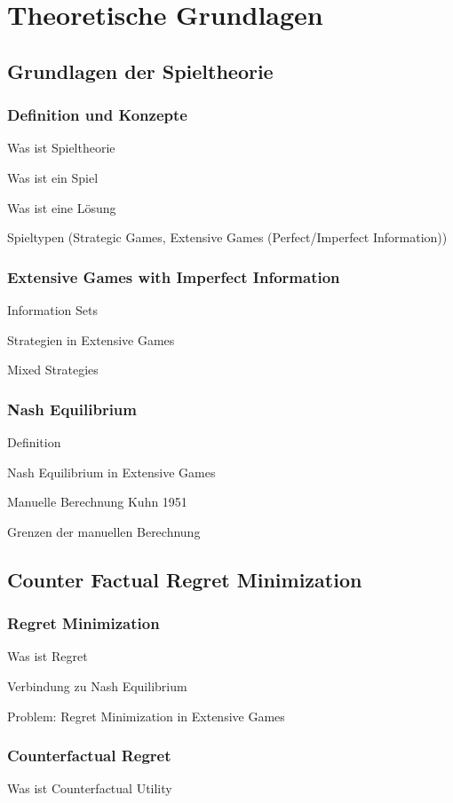 \chapter{Theoretische Grundlagen}

\section{Grundlagen der Spieltheorie}

\subsection{Definition und Konzepte}
Was ist Spieltheorie

Was ist ein Spiel

Was ist eine Lösung

Spieltypen (Strategic Games, Extensive Games (Perfect/Imperfect Information))

\subsection{Extensive Games with Imperfect Information}
Information Sets

Strategien in Extensive Games

Mixed Strategies

\subsection{Nash Equilibrium}
Definition

Nash Equilibrium in Extensive Games

Manuelle Berechnung Kuhn 1951

Grenzen der manuellen Berechnung

\section{Counter Factual Regret Minimization}

\subsection{Regret Minimization}
Was ist Regret

Verbindung zu Nash Equilibrium

Problem: Regret Minimization in Extensive Games

\subsection{Counterfactual Regret}
Was ist Counterfactual Utility

